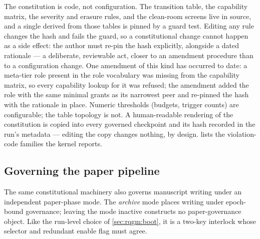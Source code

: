The constitution is code, not configuration. The transition table,
the capability matrix, the severity and erasure rules, and the
clean-room screens live in source, and a single  derived from those tables is pinned by a guard test. Editing
any rule changes the hash and fails the guard, so a constitutional
change cannot happen as a side effect: the author must re-pin the
hash explicitly, alongside a dated rationale --- a deliberate,
reviewable act, closer to an amendment procedure than to a
configuration change. One amendment of this kind has occurred to
date: a meta-tier role present in the role vocabulary was missing
from the capability matrix, so every capability lookup for it was
refused; the amendment added the role with the same minimal grants as
its narrowest peer and re-pinned the hash with the rationale in
place. Numeric thresholds (budgets, trigger counts) are configurable;
the table topology is not. A human-readable rendering of the
constitution is copied into every governed checkpoint and its hash
recorded in the run's metadata --- editing the copy changes nothing,
by design.  lists the violation-code families the
kernel reports.

\subsection{Governing the paper pipeline}\label{sec:rqgm:paper}

The same constitutional machinery also governs manuscript writing under
an independent paper-phase mode. The \emph{archive} mode places writing
under epoch-bound governance; leaving the mode inactive constructs no
paper-governance object. Like the run-level choice of
\cref{sec:rqgm:boot}, it is a two-key interlock whose selector and
redundant enable flag must agree.

